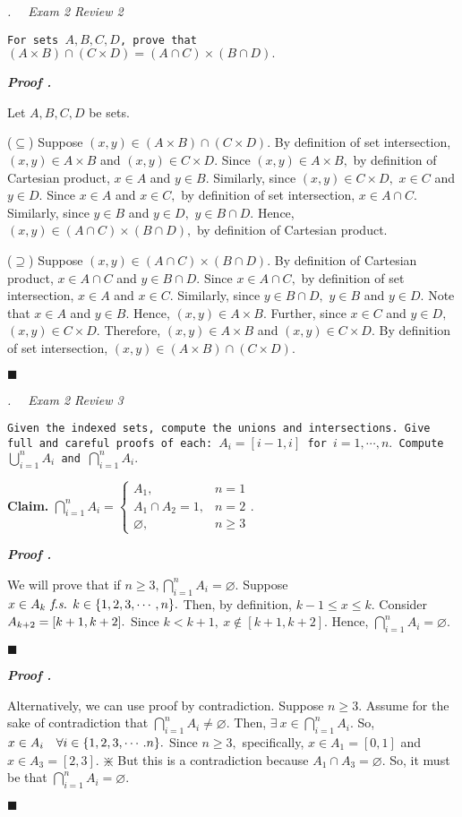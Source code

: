 \documentclass[11pt,letter]{article}
\newcounter{nq}[section]
\newcounter{np}[section]
\newenvironment*{p}{\par\noindent\textbf{\textit{Proof \stepcounter{np}\thenp. }}\par}{\par\hfill $\blacksquare$\par}
\newenvironment*{q}[1]{\noindent\emph{\thesection.\stepcounter{nq}\thenq$\quad $ #1}\par\noindent\texttt}{}
\newenvironment*{clm}{\par\noindent\textbf{Claim. }}{\par}
\def\emptyset{\varnothing}
\def\fs{\emph{ f.s. }}
\def\dsst{\displaystyle}
\begin{document}
\begin{framed}\begin{q}
	{Exam 2 Review 2}
	{For sets $A,B,C,D$, prove that $(A\times B)\cap(C\times D)=(A\cap C)\times(B\cap D).$}
\end{q}\end{framed}
\begin{p}
	Let $A,B,C,D$ be sets.\par 
	($\subseteq$) Suppose $(x,y)\in(A\times B)\cap(C\times D).$ By definition of set intersection, $(x,y)\in A\times B$ and $(x,y)\in C\times D.$ Since $(x,y)\in A\times B,$ by definition of Cartesian product, $x\in A$ and $y\in B.$ Similarly, since $(x,y)\in C\times D,$ $x\in C$ and $y\in D.$ Since $x\in A$ and $x\in C,$ by definition of set intersection, $x\in A\cap C.$ Similarly, since $y\in B$ and $y\in D,$ $y\in B\cap D.$ Hence, $(x,y)\in(A\cap C)\times(B\cap D),$ by definition of Cartesian product. \par 
	($\supseteq$) Suppose $(x,y)\in(A\cap C)\times(B\cap D).$ By definition of Cartesian product, $x\in A\cap C$ and $y\in B\cap D.$ Since $x\in A\cap C,$ by definition of set intersection, $x\in A$ and $x\in C.$ Similarly, since $y\in B\cap D,$ $y\in B$ and $y\in D.$ Note that $x\in A$ and $y\in B.$ Hence, $(x,y)\in A\times B.$ Further, since $x\in C$ and $y\in D,$ $(x,y)\in C\times D.$ Therefore, $(x,y)\in A\times B$ and $(x,y)\in C\times D.$ By definition of set intersection, $(x,y)\in(A\times B)\cap(C\times D).$
\end{p}

\begin{framed}\begin{q}
	{Exam 2 Review 3}
	{Given the indexed sets, compute the unions and intersections. Give full and careful proofs of each: $A_i=[i-1,i]$ for $i=1,\cdots,n.$ Compute $\dsst\bigcup_{i=1}^nA_i$ and $\dsst\bigcap_{i=1}^nA_i.$}
\end{q}\end{framed}
\begin{clm}
	$\dsst\bigcap_{i=1}^nA_i=\begin{cases}A_1,&n=1\\A_1\cap A_2=\qty{1},&n=2\\\emptyset,&n\geq3\end{cases}.$	
\end{clm}
\begin{p}
	We will prove that if $n\geq3,\dsst\bigcap_{i=1}^nA_i=\emptyset$. Suppose $x\in A_k\fs k\in\qty{1,2,3,\cdots,n}.$  Then, by definition, $k-1\leq x\leq k.$ Consider $A_{k+2}=\qty[k+1,k+2].$ Since $k<k+1,\ x\notin[k+1,k+2].$ Hence, $\dsst\bigcap_{i=1}^nA_i=\emptyset.$ 
\end{p}
\begin{p}
	Alternatively, we can use proof by contradiction. Suppose $n\geq3.$ Assume for the sake of contradiction that $\dsst\bigcap_{i=1}^nA_i\neq\emptyset.$ Then, $\exists\ x\in\dsst\bigcap_{i=1}^nA_i.$ So, $x\in A_i\quad\forall i\in\qty{1,2,3,\cdots.n}.$ Since $n\geq3,$ specifically, $x\in A_1=[0,1]$ and $x\in A_3=[2,3].$ $\divideontimes$ But this is a contradiction because $A_1\cap A_3=\emptyset.$ So, it must be that $\dsst\bigcap_{i=1}^nA_i=\emptyset.$	
\end{p}
\end{document}
